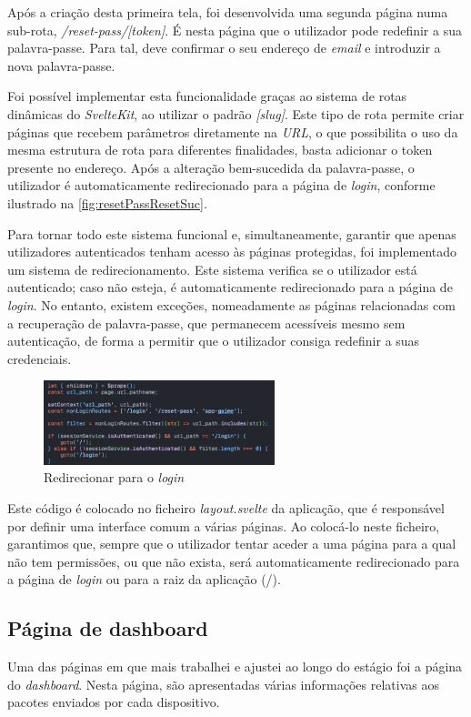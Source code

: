 Após a criação desta primeira tela, foi desenvolvida uma segunda página numa sub-rota, \textit{/reset-pass/[token]}. É nesta página que o utilizador pode redefinir a sua palavra-passe. Para tal, deve confirmar o seu endereço de \textit{email} e introduzir a nova palavra-passe.

Foi possível implementar esta funcionalidade graças ao sistema de rotas dinâmicas do \textit{SvelteKit}, ao utilizar o padrão \textit{[slug]}\cite{sveltekit.routing.url}. Este tipo de rota permite criar páginas que recebem parâmetros diretamente na \textit{URL}, o que possibilita o uso da mesma estrutura de rota para diferentes finalidades, basta adicionar o token presente no endereço. Após a alteração bem-sucedida da palavra-passe, o utilizador é automaticamente redirecionado para a página de \textit{login}, conforme ilustrado na \autoref{fig:resetPassResetSuc}.

Para tornar todo este sistema funcional e, simultaneamente, garantir que apenas utilizadores autenticados tenham acesso às páginas protegidas, foi implementado um sistema de redirecionamento. Este sistema verifica se o utilizador está autenticado; caso não esteja, é automaticamente redirecionado para a página de \textit{login}. No entanto, existem exceções, nomeadamente as páginas relacionadas com a recuperação de palavra-passe, que permanecem acessíveis mesmo sem autenticação, de forma a permitir que o utilizador consiga redefinir a suas credenciais.

\begin{figure}[h!]
    \centering
    \includegraphics[width=0.6\textwidth]{figs/redirectLogin.png}
    \caption{Redirecionar para o \textit{login}}
    \label{fig:redirectLogin}
\end{figure}

Este código é colocado no ficheiro \textit{layout.svelte} da aplicação, que é responsável por definir uma interface comum a várias páginas. Ao colocá-lo neste ficheiro, garantimos que, sempre que o utilizador tentar aceder a uma página para a qual não tem permissões, ou que não exista, será automaticamente redirecionado para a página de \textit{login} ou para a raiz da aplicação (/).

\subsection{Página de dashboard} %
Uma das páginas em que mais trabalhei e ajustei ao longo do estágio foi a página do \textit{dashboard}. Nesta página, são apresentadas várias informações relativas aos pacotes enviados por cada dispositivo.


